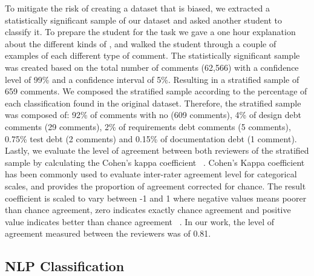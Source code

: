 
To mitigate the risk of creating a dataset that is biased, we extracted a statistically significant sample of our dataset and asked another student to classify it. To prepare the student for the task we gave a one hour explanation about the different kinds of \SATD, and walked the student through a couple of examples of each different type of \SATD comment. The statistically significant sample was created based on the total number of comments (62,566) with a confidence level of 99\% and a confidence interval of 5\%. Resulting in a stratified sample of 659 comments. We composed the stratified sample according to the percentage of each classification found in the original dataset. Therefore, the stratified sample was composed of: 92\% of comments with no \SATD (609 comments), 4\% of design debt comments (29 comments), 2\% of requirements debt comments (5 comments), 0.75\% test debt (2 comments) and 0.15\% of documentation debt (1 comment). Lastly, we evaluate the level of agreement between both reviewers of the stratified sample by calculating the Cohen's kappa coefficient ~\cite{cohen1960coefficient}. Cohen's Kappa coefficient has been commonly used to evaluate inter-rater agreement level for categorical scales, and provides the proportion of agreement corrected for chance. The result coefficient is scaled to vary between -1 and 1 where negative values means poorer than chance agreement, zero indicates exactly chance agreement and positive value indicates better than chance agreement ~\cite{fleiss1973equivalence}. In our work, the level of agreement measured between the reviewers was of 0.81.   


\subsection{NLP Classification} %
\label{sub:run_the_nlp_classifier}

